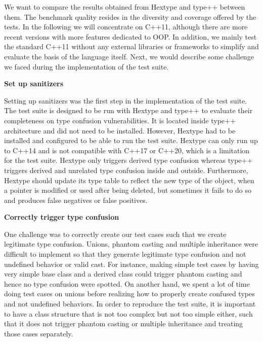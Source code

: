 \documentclass[a4paper,11pt,oneside]{report}
\begin{document}
We want to compare the results obtained from Hextype and type++ 
between them. The benchmark quality resides in the diversity and coverage
offered by the tests. In the following we will concentrate on C++11,
although there are more recent versions with more features dedicated to OOP. In
addition, we mainly test the standard C++11 without any external libraries or
frameworks to simplify and evaluate the basis of the language itself. 
Next, we would describe some challenge we faced during the implementation of the test suite.

\textbf{Set up sanitizers}

\noindent{}Setting up sanitizers was the first step in the implementation of the
test suite.  The test suite is designed to be run with Hextype and type++ to
evaluate their completeness on type confusion vulnerabilities.  It is located
inside type++ architecture and did not need to be installed. However, Hextype
had to be installed and configured to be able to run the test suite. Hextype can
only run up to C++14 and is not compatible with C++17 or C++20, which is a
limitation for the test suite. Hextype only triggers derived type confusion
whereas type++ triggers derived and unrelated type confusion inside and outside.
Furthermore, Hextype should update its type table to reflect the new type of the object, 
when a pointer is modified or used after being deleted, but sometimes it fails to do
so and produces false negatives or false positives. 


\textbf{Correctly trigger type confusion}

\noindent{}One challenge was to correctly create our test cases such that we
create legitimate type confusion.  Unions, phantom casting and multiple
inheritance were difficult to implement so that they generate legitimate type
confusion and not undefined behavior or valid cast. For instance, making simple
test cases by having very simple base class and a derived class could trigger
phantom casting and hence no type confusion were spotted. On another hand, we
spent a lot of time doing test cases on unions before realizing how to properly
create confused types and not undefined behaviors.  In order to reproduce the
test suite, it is important to have a class structure that is not too complex
but not too simple either, such that it does not trigger phantom casting or
multiple inheritance and treating those cases separately.
\end{document}
